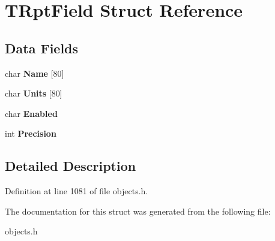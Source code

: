 \hypertarget{struct_t_rpt_field}{}\section{T\+Rpt\+Field Struct Reference}
\label{struct_t_rpt_field}
\subsection*{Data Fields}
\begin{DoxyCompactItemize}
\item 
\mbox{\label{struct_t_rpt_field_ad1f4d8ec802a30593b1aadbaf41aa205}} 
char {\bfseries Name} \mbox{[}80\mbox{]}
\item 
\mbox{\label{struct_t_rpt_field_af58dc966f5d6db1194221d5c14785bca}} 
char {\bfseries Units} \mbox{[}80\mbox{]}
\item 
\mbox{\label{struct_t_rpt_field_adca80db11b891d95cab40e4d60035a9b}} 
char {\bfseries Enabled}
\item 
\mbox{\label{struct_t_rpt_field_a42c66e1f66f4905f05cc0e4cf5b1aff0}} 
int {\bfseries Precision}
\end{DoxyCompactItemize}


\subsection{Detailed Description}


Definition at line 1081 of file objects.\+h.



The documentation for this struct was generated from the following file\+:\begin{DoxyCompactItemize}
\item 
objects.\+h\end{DoxyCompactItemize}
